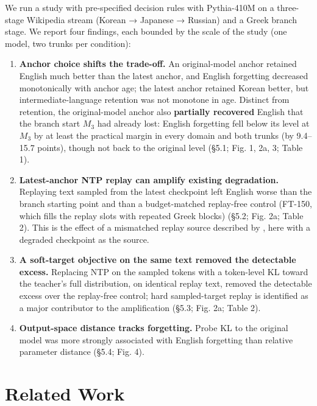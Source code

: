 \documentclass[11pt]{article}
\begin{document}
We run a study with pre-specified decision rules with Pythia-410M on a three-stage Wikipedia stream (Korean → Japanese → Russian) and a Greek branch stage. We report four findings, each bounded by the scale of the study (one model, two trunks per condition):

\begin{enumerate}
\item \textbf{Anchor choice shifts the trade-off.} An original-model anchor retained English much better than the latest anchor, and English forgetting decreased monotonically with anchor age; the latest anchor retained Korean better, but intermediate-language retention was not monotone in age. Distinct from retention, the original-model anchor also \textbf{partially recovered} English that the branch start $M_3$ had already lost: English forgetting fell below its level at $M_3$ by at least the practical margin in every domain and both trunks (by 9.4–15.7 points), though not back to the original level (§5.1; Fig. 1, 2a, 3; Table 1).
\item \textbf{Latest-anchor NTP replay can amplify existing degradation.} Replaying text sampled from the latest checkpoint left English worse than the branch starting point and than a budget-matched replay-free control (FT-150, which fills the replay slots with repeated Greek blocks) (§5.2; Fig. 2a; Table 2). This is the effect of a mismatched replay source described by \citet[Fig.~9]{marek2026}, here with a degraded checkpoint as the source.
\item \textbf{A soft-target objective on the same text removed the detectable excess.} Replacing NTP on the sampled tokens with a token-level KL toward the teacher's full distribution, on identical replay text, removed the detectable excess over the replay-free control; hard sampled-target replay is identified as a major contributor to the amplification (§5.3; Fig. 2a; Table 2).
\item \textbf{Output-space distance tracks forgetting.} Probe KL to the original model was more strongly associated with English forgetting than relative parameter distance (§5.4; Fig. 4).
\end{enumerate}


\section{Related Work}
\end{document}

